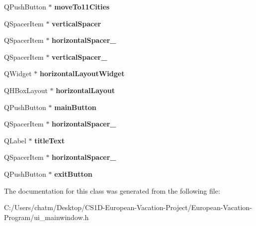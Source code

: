 \begin{DoxyCompactItemize}
\item 
\mbox{\label{class_ui___main_window_ab038373e7752969160cec00fd5cc24da}} 
Q\+Push\+Button $\ast$ {\bfseries move\+To11\+Cities}
\item 
\mbox{\label{class_ui___main_window_a8384329c3663ff274e926a12024aab52}} 
Q\+Spacer\+Item $\ast$ {\bfseries vertical\+Spacer}
\item 
\mbox{\label{class_ui___main_window_a9a022556cf8ce3fa47e51d79cb222ab0}} 
Q\+Spacer\+Item $\ast$ {\bfseries horizontal\+Spacer\+\_}
\item 
\mbox{\label{class_ui___main_window_adc1f5fdd97fb3729999c56902d0fa591}} 
Q\+Spacer\+Item $\ast$ {\bfseries vertical\+Spacer\+\_}
\item 
\mbox{\label{class_ui___main_window_a9271976c4376de565bfe96c296f4db1e}} 
Q\+Widget $\ast$ {\bfseries horizontal\+Layout\+Widget}
\item 
\mbox{\label{class_ui___main_window_acd6fdc9ebacc4b25b834162380d75ce8}} 
Q\+H\+Box\+Layout $\ast$ {\bfseries horizontal\+Layout}
\item 
\mbox{\label{class_ui___main_window_a5c315d3186a5bca7e7d71fb3c41057b3}} 
Q\+Push\+Button $\ast$ {\bfseries main\+Button}
\item 
\mbox{\label{class_ui___main_window_ae2007c6e48638f819d3ac57be8daa4ca}} 
Q\+Spacer\+Item $\ast$ {\bfseries horizontal\+Spacer\+\_}
\item 
\mbox{\label{class_ui___main_window_a892390c810f5c91a93dc843de90cf433}} 
Q\+Label $\ast$ {\bfseries title\+Text}
\item 
\mbox{\label{class_ui___main_window_a4fc05b11984637298795a354792c4023}} 
Q\+Spacer\+Item $\ast$ {\bfseries horizontal\+Spacer\+\_}
\item 
\mbox{\label{class_ui___main_window_a0a94b420ba46214964527b8bbdf424ad}} 
Q\+Push\+Button $\ast$ {\bfseries exit\+Button}
\end{DoxyCompactItemize}


The documentation for this class was generated from the following file\+:\begin{DoxyCompactItemize}
\item 
C\+:/\+Users/chatm/\+Desktop/\+C\+S1\+D-\/\+European-\/\+Vacation-\/\+Project/\+European-\/\+Vacation-\/\+Program/ui\+\_\+mainwindow.\+h\end{DoxyCompactItemize}
